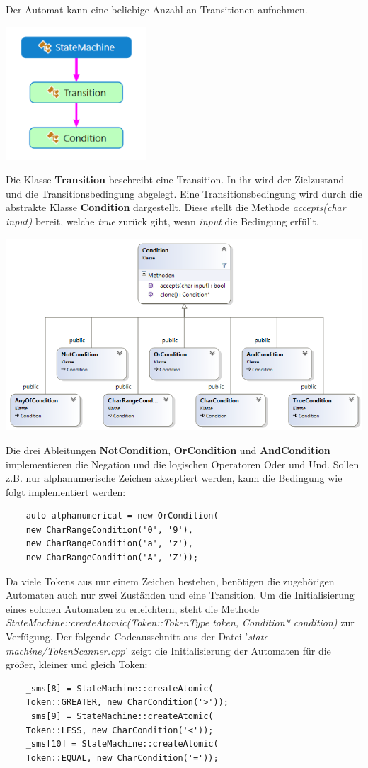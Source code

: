 \documentclass[
a4paper
]{scrreprt}
\begin{document}
	Der Automat kann eine beliebige Anzahl an Transitionen aufnehmen.  
	\begin{center}		
		\includegraphics{./images/statemachine_dependency.png}
	\end{center}
	Die Klasse \textbf{Transition} beschreibt eine Transition. In ihr wird der Zielzustand und die Transitionsbedingung abgelegt. Eine Transitionsbedingung wird durch die abstrakte Klasse \textbf{Condition} dargestellt. Diese stellt die Methode \textit{accepts(char input)} bereit, welche \textit{true} zurück gibt, wenn \textit{input} die Bedingung erfüllt.
	\begin{center}		
		\includegraphics[width=\linewidth]{./images/condition_cd.png}
	\end{center}
	Die drei Ableitungen \textbf{NotCondition}, \textbf{OrCondition} und \textbf{AndCondition} implementieren die Negation und die logischen Operatoren Oder und Und. Sollen z.B. nur alphanumerische Zeichen akzeptiert werden, kann die Bedingung wie folgt implementiert werden:	 
	\begin{lstlisting}
	auto alphanumerical = new OrCondition(
	new CharRangeCondition('0', '9'),
	new CharRangeCondition('a', 'z'), 
	new CharRangeCondition('A', 'Z'));
	\end{lstlisting}
	Da viele Tokens aus nur einem Zeichen bestehen, benötigen die zugehörigen Automaten auch nur zwei Zuständen und eine Transition. Um die Initialisierung eines solchen Automaten zu erleichtern, steht die Methode \textit{StateMachine::createAtomic(Token::TokenType token, Condition* condition)} zur Verfügung. Der folgende Codeausschnitt aus der Datei '\textit{state-machine/TokenScanner.cpp}' zeigt die Initialisierung der Automaten für die größer, kleiner und gleich Token:
	\begin{lstlisting}
	_sms[8] = StateMachine::createAtomic(
	Token::GREATER, new CharCondition('>'));
	_sms[9] = StateMachine::createAtomic(
	Token::LESS, new CharCondition('<'));
	_sms[10] = StateMachine::createAtomic(
	Token::EQUAL, new CharCondition('='));
	\end{lstlisting}
	
\end{document}
